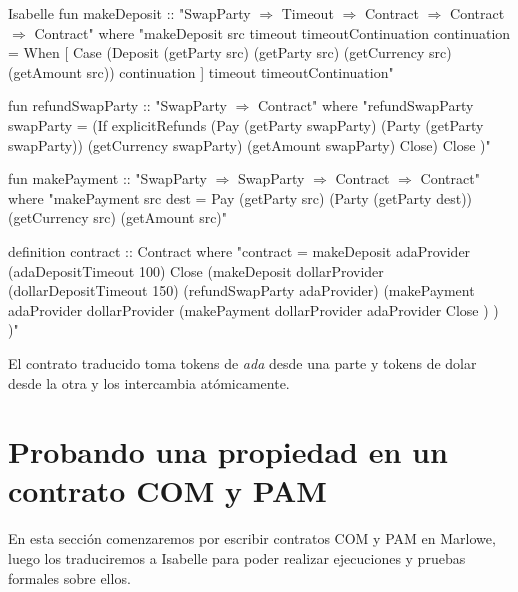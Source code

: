 \documentclass[12pt]{book}
\begin{document}
\begin{code}[title=Definición del contrato \textit{Swap}]{Isabelle}
fun makeDeposit :: "SwapParty $\Rightarrow$ Timeout $\Rightarrow$ Contract $\Rightarrow$ Contract $\Rightarrow$
                    Contract" where
"makeDeposit src timeout timeoutContinuation continuation =
  When [ Case (Deposit 
                (getParty src)
                (getParty src)
                (getCurrency src) 
                (getAmount src))
                continuation
       ] timeout
         timeoutContinuation"

fun refundSwapParty :: "SwapParty $\Rightarrow$ Contract" where
"refundSwapParty swapParty = (If explicitRefunds
                                (Pay
                                  (getParty swapParty)
                                  (Party (getParty swapParty))
                                  (getCurrency swapParty)
                                  (getAmount swapParty)
                                  Close)
                                Close
                              )"

fun makePayment :: "SwapParty $\Rightarrow$ SwapParty $\Rightarrow$ Contract $\Rightarrow$ Contract" where
"makePayment src dest =
  Pay (getParty src)
      (Party (getParty dest))
      (getCurrency src)
      (getAmount src)"


definition contract :: Contract where
"contract = makeDeposit 
              adaProvider 
              (adaDepositTimeout 100)
              Close
              (makeDeposit 
                  dollarProvider
                  (dollarDepositTimeout 150)
                  (refundSwapParty adaProvider)
                  (makePayment 
                      adaProvider 
                      dollarProvider
                      (makePayment 
                          dollarProvider 
                          adaProvider
                          Close
                      )
                  )
              )"
\end{code}

El contrato traducido toma tokens de \textit{ada} desde una parte y tokens de dolar desde la otra y los intercambia atómicamente.


\section{Probando una propiedad en un contrato COM y PAM}

En esta sección comenzaremos por escribir contratos COM y PAM en Marlowe, luego los traduciremos a Isabelle para poder realizar ejecuciones y pruebas formales sobre ellos.
\end{document}
